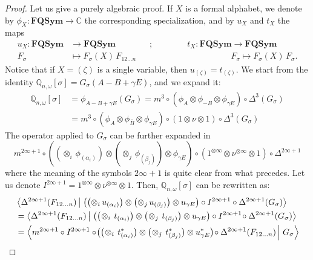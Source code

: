 \documentclass[smallextended,nospthms]{svjour3}
\theoremstyle{remark}
\newcommand{\C}{\mathbb{C}}
\newcommand{\FQSym}{\mathbf{FQSym}}
\newcommand{\qproba}{\mathbb{Q}}
\newcommand{\scal}[2]{\left\langle #1\vphantom{#2}\,\right |\left.#2 \vphantom{#1}\right\rangle}
\begin{document}
\begin{proof}
Let us give a purely algebraic proof. If $X$ is a formal alphabet, we denote by $\phi_{X} : \FQSym \to \C$ the corresponding specialization, and by $u_{X}$ and $t_{X}$ the maps 
\begin{align*}
u_{X}:\FQSym &\to \FQSym\qquad\qquad;\qquad\qquad t_{X}:\FQSym \to \FQSym\\
F_{\sigma} &\mapsto F_{\sigma}(X)\, F_{12\ldots n}\qquad\qquad\qquad\qquad\quad\,\qquad F_{\sigma}\mapsto F_{\sigma}(X)\,F_{\sigma}.
\end{align*}
Notice that if $X=(\zeta)$ is a single variable, then $u_{(\zeta)}=t_{(\zeta)}$. 
We start from the identity $\qproba_{n,\omega}[\sigma]=G_{\sigma}(A-B+\gamma E)$, and we expand it:
\begin{align*}
\qproba_{n,\omega}[\sigma]&=\phi_{A-B+\gamma E}(G_{\sigma})=m^{3}\circ (\phi_{A}\otimes \phi_{-B}\otimes \phi_{\gamma E})\circ \Delta^{3} (G_{\sigma})\\
&=m^{3}\circ (\phi_{A}\otimes \phi_{\overline{B}}\otimes \phi_{\gamma E})\circ(1\otimes \nu \otimes 1)\circ \Delta^{3} (G_{\sigma})
\end{align*}
The operator applied to $G_{\sigma}$ can be further expanded in 
$$m^{2\infty +1}\circ \left(\left(\otimes_{i}\,\phi_{(\alpha_{i})}\right) \otimes \left(\otimes_{j}\,\phi_{(\beta_{j})}\right) \otimes \phi_{\gamma E}\right)\circ\left(1^{\otimes \infty}\otimes \nu^{\otimes \infty} \otimes 1\right)\circ \Delta^{2\infty +1}$$
where the meaning of the symbols $2\infty+1$ is quite clear from what precedes. Let us denote $I^{2\infty+1} = 1^{\otimes \infty}\otimes \nu^{\otimes \infty}\otimes 1$. Then, $\mathbb{Q}_{n,\omega}[\sigma]$ can be rewritten as:
\begin{align*}
&\scal{\Delta^{2 \infty +1}(F_{12\ldots n})}{\left(\left(\otimes_{i}\,u_{(\alpha_{i})}\right) \otimes \left(\otimes_{j}\,u_{(\beta_{j})}\right) \otimes u_{\gamma E}\right)\circ I^{2\infty+1} \circ \Delta^{2\infty +1} (G_{\sigma})}\\
&=\scal{\Delta^{2 \infty +1}(F_{12\ldots n})}{\big(\big(\!\otimes_{i}\,t_{(\alpha_{i})}\big) \otimes \big(\!\otimes_{j}\,t_{(\beta_{j})}\big) \otimes u_{\gamma E}\big)\circ I^{2\infty+1} \!\circ \Delta^{2\infty +1} (G_{\sigma})}\\
&=\scal{m^{2\infty+1} \circ I^{2\infty+1} \circ \! \big(\big(\!\otimes_{i}\,t_{(\alpha_{i})}^{*}\big) \otimes \big(\!\otimes_{j}\,t_{(\beta_{j})}^{*}\big) \otimes u_{\gamma E}^{*}\big) \! \circ \Delta^{2 \infty +1}(F_{12\ldots n})}{G_{\sigma}}
\end{align*}

\end{proof}
\end{document}
